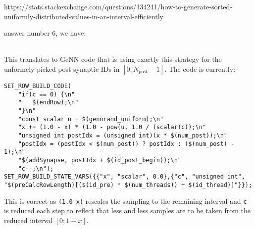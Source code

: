 \documentclass{article}
\begin{document}
https://stats.stackexchange.com/questions/134241/how-to-generate-sorted-uniformly-distributed-values-in-an-interval-efficiently

answer number 6, we have:

\\[0.3cm]

This translates to GeNN code that is using exactly this strategy for
the unformely picked post-synaptic IDs in $[0,
  N_{\text{post}}-1]$. The code is currently:
\begin{verbatim}
SET_ROW_BUILD_CODE(
    "if(c == 0) {\n"
    "   $(endRow);\n"
    "}\n"
    "const scalar u = $(gennrand_uniform);\n"
    "x += (1.0 - x) * (1.0 - pow(u, 1.0 / (scalar)c));\n"
    "unsigned int postIdx = (unsigned int)(x * $(num_post));\n"
    "postIdx = (postIdx < $(num_post)) ? postIdx : ($(num_post) - 1);\n"
    "$(addSynapse, postIdx + $(id_post_begin));\n"
    "c--;\n");
SET_ROW_BUILD_STATE_VARS({{"x", "scalar", 0.0},{"c", "unsigned int", 
"$(preCalcRowLength)[($(id_pre) * $(num_threads)) + $(id_thread)]"}});
\end{verbatim}
This is correct as \verb+(1.0-x)+ rescales the sampling to the
remaining interval and \verb+c+ is reduced each step to reflect that
less and less samples are to be taken from the reduced interval
$[0;1-x]$.
\end{document}
